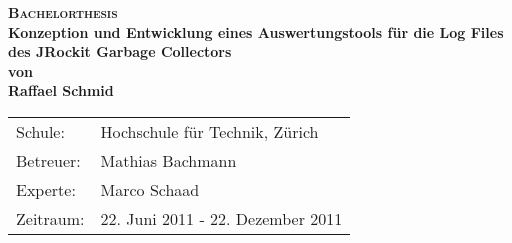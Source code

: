 \begin{titlepage}
\begin{center}
\textsc{\Huge \bf Bachelorthesis}\\[0.4cm]
\LARGE \textbf{Konzeption und Entwicklung eines Auswertungstools für die Log Files des JRockit Garbage Collectors}\\[1.0cm]
\large \textbf{von}\\[0.5cm]
\large \textbf{Raffael Schmid}\\[4cm]
\vspace{7cm}

\end{center}

\begin{tabular}[ht]{ll}
  Schule: & Hochschule für Technik, Zürich\\
  Betreuer: & Mathias Bachmann\\
  Experte: & Marco Schaad \\
  Zeitraum: & 22. Juni 2011 - 22. Dezember 2011
\end{tabular}
\end{titlepage}
